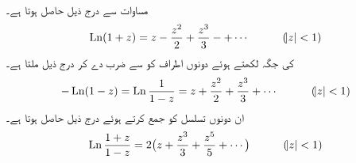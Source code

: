 \quad {}\\
مساوات  سے درج ذیل حاصل ہوتا ہے۔
\begin{align}
\operatorname{Ln} (1+z)=z-\frac{z^2}{2}+\frac{z^3}{3}-+\cdots\quad \quad \quad (\abs{z}<1)
\end{align}
 کی جگہ  لکھتے ہوئے دونوں اطراف کو  سے ضرب دے کر درج ذیل ملتا ہے۔
\begin{align}
-\operatorname{Ln}(1-z)=\operatorname{Ln} \frac{1}{1-z}=z+\frac{z^2}{2}+\frac{z^3}{3}+\cdots \quad \quad \quad (\abs{z}<1)
\end{align}
ان دونوں تسلسل کو جمع کرتے ہوئے درج ذیل حاصل ہوتا ہے۔
\begin{align}
\operatorname{Ln} \frac{1+z}{1-z}=2\big(z+\frac{z^3}{3}+\frac{z^5}{5}+\cdots\big)\quad \quad \quad (\abs{z}<1)
\end{align}


